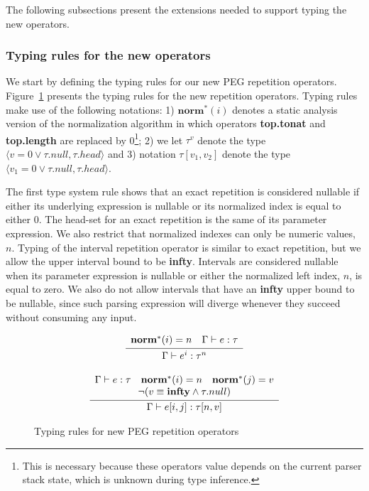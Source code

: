 \documentclass[sigplan,screen]{acmart}
\theoremstyle{definition}
\begin{document}
The following subsections present the extensions needed to
support typing the new operators.

\subsubsection{Typing rules for the new operators}

We start by defining the typing rules for our new PEG repetition operators.
Figure~\ref{fig:typing-repetition} presents the typing rules for the new
repetition operators. Typing rules make use of the following notations:
1) $\mathbf{norm}^*(i)$ denotes a static analysis
version of the normalization algorithm in which operators \textbf{top.tonat}
and \textbf{top.length} are replaced by 0\footnote{This is necessary because these
operators value depends on the current parser stack state, which is unknown
during type inference.}; 2) we let $\tau^v$ denote the
type $\langle v = 0 \lor \tau.null, \tau.head\rangle$ and
3) notation $\tau[v_1,v_2]$ denote the type
$\langle v_1 = 0 \lor \tau.null, \tau.head\rangle$.


The first type system rule shows that an exact repetition is considered
nullable if either its underlying expression is nullable or its normalized index
is equal to either $0$. The head-set for an exact repetition is
the same of its parameter expression. We also restrict that normalized indexes can
only be numeric values, $n$.
Typing of the interval repetition operator is similar to exact repetition, but
we allow the upper interval bound to be \textbf{infty}.
Intervals are considered nullable when
its parameter expression is nullable or either the normalized left index, $n$,
is equal to zero. We also do not allow intervals that have an \textbf{infty}
upper bound to be nullable, since such parsing expression will diverge
whenever they succeed without consuming any input.

\begin{figure}[H]
  \[
    \begin{array}{c}
      \infer{\Gamma \vdash e^i : \tau^n}
            {\begin{array}{c}
              \mathbf{norm}^*(i) = n\quad \Gamma \vdash e : \tau \\
            \end{array}} \\ \\
        \infer{\Gamma\vdash e[i,j] : \tau[n,v] }
              {\begin{array}{ccc}
                  \Gamma \vdash e : \tau &
                  \mathbf{norm}^*(i) = n &
                  \mathbf{norm}^*(j) = v \\
                  \multicolumn{3}{c}{
                  \neg (v \equiv \mathbf{infty} \land\tau.null)}
               \end{array}}
    \end{array}
  \]
  \caption{Typing rules for new PEG repetition operators}
  \label{fig:typing-repetition}
\end{figure}
\end{document}
